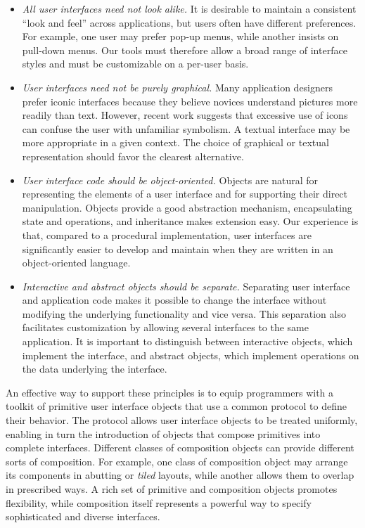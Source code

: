 \begin{itemize}
\item {\em All user interfaces need not look alike.}  
It is desirable to maintain a consistent ``look and feel'' across
applications, but users often have different preferences.  For example, one
user may prefer pop-up menus, while another insists on pull-down menus.  Our
tools must therefore allow a broad range of interface styles and must be
customizable on a per-user basis.

\item {\em User interfaces need not be purely graphical.}
Many application designers prefer iconic interfaces because they believe
novices understand pictures more readily than text.  However, recent work
\cite{potosnak} suggests that excessive use of icons can confuse the
user with unfamiliar symbolism.  A textual interface may be
more appropriate in a given context.  The choice of graphical or textual
representation should favor the clearest alternative.

\item {\em User interface code should be object-oriented.} 
Objects are natural for representing the elements of a user interface and for
supporting their direct manipulation.  Objects provide a good abstraction
mechanism, encapsulating state and operations, and inheritance makes extension
easy.  Our experience is that, compared to a procedural
implementation, user interfaces are significantly easier to
develop and maintain when they are written in an object-oriented language.

\item {\em Interactive and abstract objects should be separate.} 
Separating user interface and application code makes it possible to change the
interface without modifying the underlying functionality and vice versa.  This
separation also facilitates customization by allowing several interfaces to
the same application.  It is important to
distinguish between interactive objects, which
implement the interface, and abstract objects, which implement operations on
the data underlying the interface.

\end{itemize}

An effective way to support these principles is to equip programmers
with a toolkit of primitive user interface objects that use a common
protocol to define their behavior.  The protocol allows user interface
objects to be treated uniformly, enabling in turn the introduction of
objects that compose primitives into complete interfaces.  Different
classes of composition objects can provide different sorts of
composition.  For example, one class of composition object may arrange
its components in abutting or {\em tiled} layouts, while another
allows them to overlap in prescribed ways.  A rich set of primitive
and composition objects promotes flexibility, while composition itself
represents a powerful way to specify sophisticated and diverse
interfaces.

